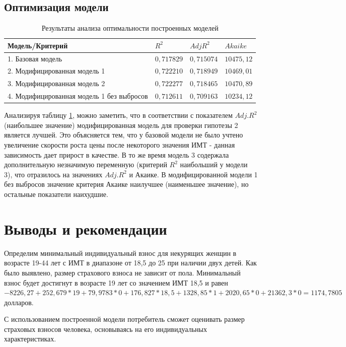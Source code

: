 \documentclass[a4paper,12pt]{article}
\begin{document}
\subsection{Оптимизация модели}
\begin{table}[H]
	\begin{center}
		\begin{tabular}{ | l | l | l | l |}
			\hline
			Модель/Критерий & $R^2$ & $Adj R^2$ & $Akaike$ \\ \hline
			1. Базовая модель & $0,717829$ & $0,715074$ & $10475,12$ \\ \hline
			2. Модифицированная модель 1 & $0,722210$ & $0,718949$ & $10469,01$ \\ \hline
			3. Модифицированная модель 2 & $0,722277$ & $0,718465$ & $10470,89$ \\ \hline
			4. Модифицированная модель 1 без выбросов & $0,712611$ & $0,709163$ & $10234,12$ \\ \hline
		\end{tabular}
	\end{center}
	\caption{Результаты анализа оптимальности построенных моделей}
	\label{tab:optim}
\end{table}

Анализируя таблицу \ref{tab:optim}, можно заметить, что в соответствии с показателем $Adj. R^2$ (наибольшее значение) модифицированная модель для проверки гипотезы 2 является лучшей. Это объясняется тем, что у базовой модели не было учтено увеличение скорости роста цены после некоторого значения ИМТ - данная зависимость дает прирост в качестве. В то же время модель 3 содержала дополнительную незначимую переменную (критерий $R^2$ наибольший у модели 3), что отразилось на значениях $Adj. R^2$ и Акаике. В модифицированной модели 1 без выбросов значение критерия Акаике наилучшее (наименьшее значение), но остальные показатели наихудшие.

\section{Выводы и рекомендации}
Определим минимальный индивидуальный взнос для некурящих женщин в возрасте 19-44 лет с ИМТ в диапазоне от 18,5 до 25 при наличии двух детей. Как было выявлено, размер страхового взноса не зависит от пола. Минимальный взнос будет достигнут в возрасте 19 лет со значением ИМТ 18,5 и равен $-8226,27 + 252,679 * 19 + 79,9783 * 0 + 176,827 * 18,5 + 1328,85 * 1  + 2020,65 * 0 + 21362,3 * 0 = 1174,7805$ долларов.

С использованием построенной модели потребитель сможет оценивать размер страховых взносов человека, основываясь на его индивидуальных характеристиках. 
\end{document}
